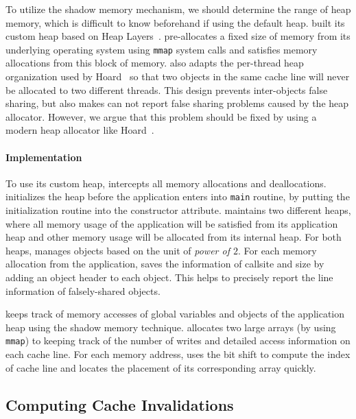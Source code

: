 To utilize the shadow memory mechanism, we should determine the range of heap memory, which is difficult to know beforehand if using the default heap. \cheetah{} built its custom heap based on Heap Layers~\cite{Berger:2001:CHM:378795.378821}. \cheetah{} pre-allocates a fixed size of memory
from its underlying operating system using \texttt{mmap} system calls and satisfies memory allocations from this block of memory. \cheetah{} also adapts the per-thread heap organization used by Hoard~\cite{Hoard} so that two objects in the same cache line will never be allocated to two different threads. This design prevents inter-objects false sharing, but also makes \cheetah{} can not report false sharing problems caused by the heap allocator.  However, we argue that this problem should be fixed by using a modern heap allocator like Hoard~\cite{Hoard}. 

\paragraph{Implementation} 
To use its custom heap, \cheetah{} intercepts all memory allocations and deallocations. \cheetah{} initializes the heap before the application enters into \texttt{main} routine, by putting the initialization routine into the constructor attribute. \cheetah{} maintains two different heaps, where all memory usage of the application will be satisfied from its application heap and other memory usage will be allocated from its  internal heap. For both heaps, \cheetah{} manages objects based on the unit of {\it power of $2$}. For each memory allocation from the application, \cheetah{} saves the information of callsite and size by adding an object header to each object. This helps \cheetah{} to precisely report the line information of falsely-shared objects.  

\cheetah{} keeps track of memory accesses of global variables and objects of the application heap using the shadow memory technique. \Cheetah{} allocates two large arrays (by using \texttt{mmap}) to keeping track of the number of writes and detailed access information on each cache line. For each memory address, \cheetah{} uses the bit shift to compute the index of cache line and locates the placement of its corresponding array quickly. 


\subsection{Computing Cache Invalidations}
\label{sec:computeinvalidations}

